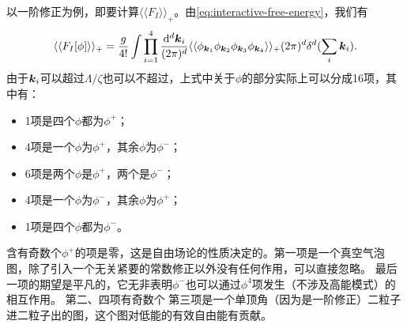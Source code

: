 \documentclass[hyperref, UTF8, a4paper]{ctexart}
\newcommand*{\cexpval}[1]{\langle \langle #1 \rangle \rangle}
\begin{document}
以一阶修正为例，即要计算$\cexpval{F_I}_+$。由\eqref{eq:interactive-free-energy}，我们有
\[
    \cexpval{F_I[\phi]}_+ = \frac{g}{4!} \int \prod_{i=1}^4 \frac{\dd[d]{\vb*{k}_i}}{(2\pi)^d} \cexpval{\phi_{\vb*{k}_1} \phi_{\vb*{k}_2} \phi_{\vb*{k}_3} \phi_{\vb*{k}_4}}_+ (2\pi)^d \delta^d(\sum_{i} \vb*{k}_i).
\]
由于$\vb*{k}_i$可以超过$\Lambda/\zeta$也可以不超过，上式中关于$\phi$的部分实际上可以分成16项，其中有：
\begin{itemize}
    \item 1项是四个$\phi$都为$\phi^+$；
    \item 4项是一个$\phi$为$\phi^+$，其余$\phi$为$\phi^-$；
    \item 6项是两个$\phi$是$\phi^+$，两个是$\phi^-$；
    \item 4项是一个$\phi$为$\phi^-$，其余$\phi$为$\phi^+$；
    \item 1项是四个$\phi$都为$\phi^-$。
\end{itemize}
含有奇数个$\phi^+$的项是零，这是自由场论的性质决定的。第一项是一个真空气泡图，除了引入一个无关紧要的常数修正以外没有任何作用，可以直接忽略。
最后一项的期望是平凡的，它无非表明$\phi^-$也可以通过$\phi^4$项发生（不涉及高能模式）的相互作用。
第二、四项有奇数个
第三项是一个单顶角（因为是一阶修正）二粒子进二粒子出的图，这个图对低能的有效自由能有贡献。
\end{document}

